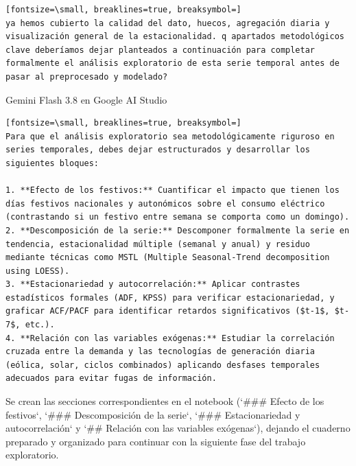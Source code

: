 \documentclass[12pt,a4paper,oneside]{book}
\begin{document}
\begin{iaprompt}
\begin{Verbatim}[fontsize=\small, breaklines=true, breaksymbol=]
ya hemos cubierto la calidad del dato, huecos, agregación diaria y visualización general de la estacionalidad. q apartados metodológicos clave deberíamos dejar planteados a continuación para completar formalmente el análisis exploratorio de esta serie temporal antes de pasar al preprocesado y modelado?
\end{Verbatim}
\end{iaprompt}
\begin{iaresp}{Gemini Flash 3.8 en Google AI Studio}
\begin{Verbatim}[fontsize=\small, breaklines=true, breaksymbol=]
Para que el análisis exploratorio sea metodológicamente riguroso en series temporales, debes dejar estructurados y desarrollar los siguientes bloques:

1. **Efecto de los festivos:** Cuantificar el impacto que tienen los días festivos nacionales y autonómicos sobre el consumo eléctrico (contrastando si un festivo entre semana se comporta como un domingo).
2. **Descomposición de la serie:** Descomponer formalmente la serie en tendencia, estacionalidad múltiple (semanal y anual) y residuo mediante técnicas como MSTL (Multiple Seasonal-Trend decomposition using LOESS).
3. **Estacionariedad y autocorrelación:** Aplicar contrastes estadísticos formales (ADF, KPSS) para verificar estacionariedad, y graficar ACF/PACF para identificar retardos significativos ($t-1$, $t-7$, etc.).
4. **Relación con las variables exógenas:** Estudiar la correlación cruzada entre la demanda y las tecnologías de generación diaria (eólica, solar, ciclos combinados) aplicando desfases temporales adecuados para evitar fugas de información.
\end{Verbatim}
\end{iaresp}
\begin{iaanalisis}
Se crean las secciones correspondientes en el notebook (`### Efecto de los festivos`, `### Descomposición de la serie`, `### Estacionariedad y autocorrelación` y `## Relación con las variables exógenas`), dejando el cuaderno preparado y organizado para continuar con la siguiente fase del trabajo exploratorio.
\end{iaanalisis}
\end{document}
